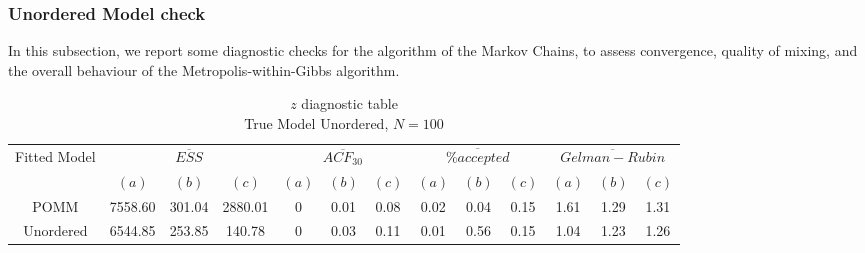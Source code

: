 \documentclass[11pt]{amsart}
\begin{document}
\subsubsection{Unordered Model check}

In this subsection, we report some diagnostic checks for the algorithm of the Markov Chains, to assess convergence, quality of mixing, and the overall behaviour of the Metropolis-within-Gibbs algorithm.




\begin{table}[h]
\centering
\caption{
{\large $z$ diagnostic table} \\ 
{\small True Model Unordered, $N=100$}
} 
\begin{tabular}{ccccccccccccc}
\toprule
\multirow{2}{*}{Fitted Model} & \multicolumn{3}{c}{$\overline{ESS}$} & \multicolumn{3}{c}{
$\overline{ACF_{30}}$} & \multicolumn{3}{c}{$\overline{\% accepted}$} & \multicolumn{3}{c}{$\overline{Gelman-Rubin}$}\\
\cmidrule(lr){2-4} \cmidrule(lr){5-7} \cmidrule(lr){8-10} \cmidrule(lr){11-13} 
& $(a)$ & $(b)$ & $(c)$ & $(a)$ & $(b)$ & $(c)$ & $(a)$ & $(b)$ & $(c)$ & $(a)$ & $(b)$ & $(c)$ \\
\midrule
POMM &7558.60 & 301.04 & 2880.01 & 0 & 0.01 & 0.08 & 0.02 & 0.04 & 0.15 &  1.61 & 1.29 & 1.31  \\
Unordered &6544.85 & 253.85 & 140.78 & 0 & 0.03 & 0.11 & 0.01 & 0.56 & 0.15 & 1.04 & 1.23 & 1.26   \\
\bottomrule
\end{tabular}
\label{table:z_diagnostics_Unordered}
\end{table}
\end{document}
